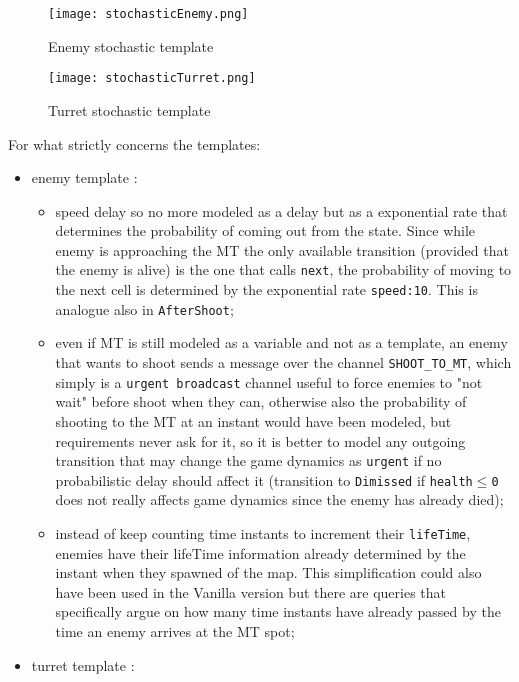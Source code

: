 \documentclass[
10pt, %
a4paper, %
oneside, %
headinclude,footinclude, %
BCOR5mm, %
]{scrartcl}
\begin{document}
	\begin{figure}[h!]
		\centering
		\begin{minipage}{.6\textwidth}
			\centering
			\texttt{[image: stochasticEnemy.png]}
			\caption{Enemy stochastic template}
		\end{minipage}%
		\begin{minipage}{.4\textwidth}
			\centering
			\texttt{[image: stochasticTurret.png]}
			\caption{Turret stochastic template}
		\end{minipage}
	\end{figure}
	
	For what strictly concerns the templates:
	\begin{itemize}
		\item enemy template :
			\begin{itemize}
				\item speed delay so no more modeled as a delay but as a exponential rate that determines the probability of coming out from the state. Since while enemy is approaching the MT the only available transition (provided that the enemy is alive) is the one that calls \texttt{next}, the probability of moving to the next cell is determined by the exponential rate \texttt{speed:10}. This is analogue also in \texttt{AfterShoot};
				\item even if MT is still modeled as a variable and not as a template, an enemy that wants to shoot sends a message over the channel \texttt{SHOOT\_TO\_MT}, which simply is a \texttt{urgent broadcast} channel useful to force enemies to "not wait" before shoot when they can, otherwise also the probability of shooting to the MT at an instant would have been modeled, but requirements never ask for it, so it is better to model any outgoing transition that may change the game dynamics as \texttt{urgent} if no probabilistic delay should affect it (transition to \texttt{Dimissed} if \texttt{health$\leq$0} does not really affects game dynamics since the enemy has already died);
				\item instead of keep counting time instants to increment their \texttt{lifeTime}, enemies have their lifeTime information already determined by the instant when they spawned of the map. This simplification could also have been used in the Vanilla version but there are queries that specifically argue on how many time instants have already passed by the time an enemy arrives at the MT spot;
			\end{itemize}
		\item turret template :

\end{itemize}
\end{document}
